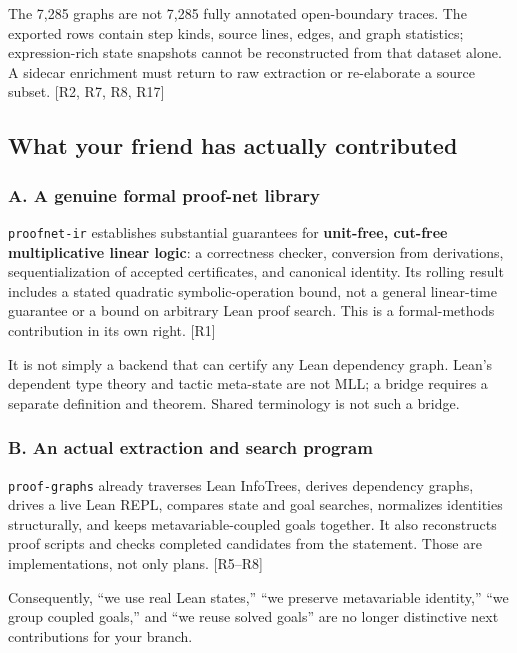 \documentclass[
  10pt,
]{article}
\begin{document}
The 7,285 graphs are not 7,285 fully annotated open-boundary traces. The
exported rows contain step kinds, source lines, edges, and graph
statistics; expression-rich state snapshots cannot be reconstructed from
that dataset alone. A sidecar enrichment must return to raw extraction
or re-elaborate a source subset. {[}R2, R7, R8, R17{]}

\subsection{What your friend has actually
contributed}\label{what-your-friend-has-actually-contributed}

\subsubsection{A. A genuine formal proof-net
library}\label{a.-a-genuine-formal-proof-net-library}

\texttt{proofnet-ir} establishes substantial guarantees for
\textbf{unit-free, cut-free multiplicative linear logic}: a correctness
checker, conversion from derivations, sequentialization of accepted
certificates, and canonical identity. Its rolling result includes a
stated quadratic symbolic-operation bound, not a general linear-time
guarantee or a bound on arbitrary Lean proof search. This is a
formal-methods contribution in its own right. {[}R1{]}

It is not simply a backend that can certify any Lean dependency graph.
Lean's dependent type theory and tactic meta-state are not MLL; a bridge
requires a separate definition and theorem. Shared terminology is not
such a bridge.

\subsubsection{B. An actual extraction and search
program}\label{b.-an-actual-extraction-and-search-program}

\texttt{proof-graphs} already traverses Lean InfoTrees, derives
dependency graphs, drives a live Lean REPL, compares state and goal
searches, normalizes identities structurally, and keeps
metavariable-coupled goals together. It also reconstructs proof scripts
and checks completed candidates from the statement. Those are
implementations, not only plans. {[}R5--R8{]}

Consequently, ``we use real Lean states,'' ``we preserve metavariable
identity,'' ``we group coupled goals,'' and ``we reuse solved goals''
are no longer distinctive next contributions for your branch.
\end{document}
